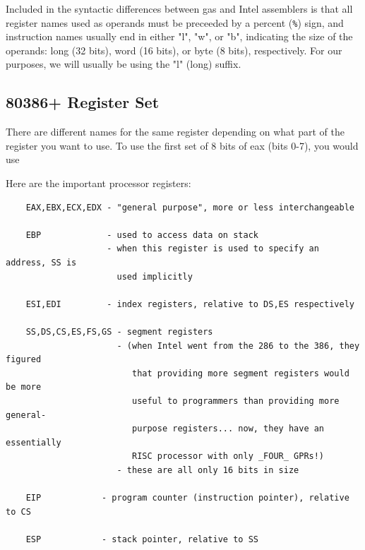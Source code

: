 \documentclass{note}
\begin{document}
{Included in the syntactic differences between gas and Intel assemblers is that
all register names used as operands must be preceeded by a percent (\verb+%+)
                                sign, and instruction names usually end in
                                either "l", "w", or "b", indicating the size
                                of the operands: long (32 bits), word (16
                                bits), or byte (8 bits), respectively. For
                                our purposes, we will usually be using the
                                "l" (long) suffix. 

\subsection{80386+ Register Set}
There are different names for the same register depending on what part of the register you want to use. To use the first set of 8 bits of eax (bits 0-7), you would use %

Here are the important processor registers:
\begin{verbatim}
    EAX,EBX,ECX,EDX - "general purpose", more or less interchangeable

    EBP             - used to access data on stack
                    - when this register is used to specify an address, SS is
                      used implicitly

    ESI,EDI         - index registers, relative to DS,ES respectively

    SS,DS,CS,ES,FS,GS - segment registers
                      - (when Intel went from the 286 to the 386, they figured
                         that providing more segment registers would be more
                         useful to programmers than providing more general-
                         purpose registers... now, they have an essentially
                         RISC processor with only _FOUR_ GPRs!)
                      - these are all only 16 bits in size

    EIP            - program counter (instruction pointer), relative to CS

    ESP            - stack pointer, relative to SS


\end{verbatim}}
\end{document}
